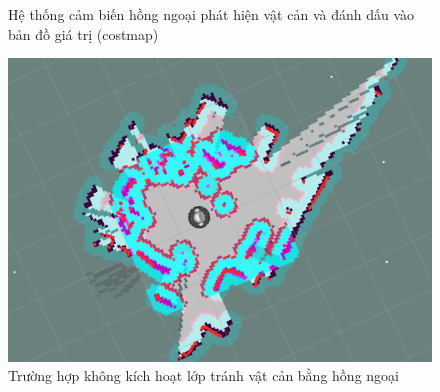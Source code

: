 {\begin{figure}[htbp]
    \centering
    \hspace{8pt}
    \caption{Hệ thống cảm biến hồng ngoại phát hiện vật cản và đánh dấu vào bản đồ giá trị (costmap)}
    \label{fig:rb_withIR_ObstacleDetected}
\end{figure}

\begin{figure}[htbp]
    \centering
    \includegraphics[width=0.75\linewidth]{figures/RB_withoutIR_obstacleDetect.png}
    \caption{Trường hợp không kích hoạt lớp tránh vật cản bằng hồng ngoại}
    \label{fig:rb_withoutIR}
\end{figure}

}
